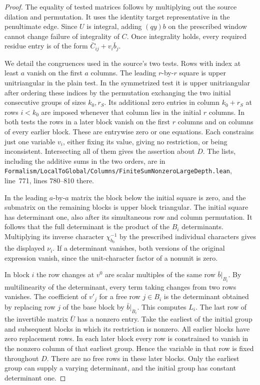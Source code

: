 \documentclass[a4paper,11pt]{article}
\theoremstyle{definition}
\theoremstyle{remark}
\newcommand{\srcloc}[2]{{\small\nolinkurl{#1.lean}}, line~#2}
\numberwithin{equation}{section}
\begin{document}
\begin{proof}
The equality of tested matrices follows by multiplying out
the source dilation and permutation. It uses the identity
target representative in the penultimate edge. Since \(U\)
is integral, adding \((qy)b\) on the prescribed window cannot
change failure of integrality of \(C\). Once integrality
holds, every required residue entry is of the form
\(\bar C_{ij}+v_i\bar b_j\).

We detail the congruences used in the source's two tests.
Rows with index at least \(a\) vanish on the first \(a\)
columns. The leading \(r\)-by-\(r\) square is upper
unitriangular in the plain test. In the symmetrized test
it is upper unitriangular after ordering these indices by
the permutation exchanging the two initial consecutive groups
of sizes \(k_0,r_S\). Its additional zero entries in column
\(k_0+r_S\) at rows \(i<k_0\) are imposed whenever that column lies in the
initial \(r\) columns. In both tests the rows in a later
block vanish on the first \(r\) columns and on columns of
every earlier block. These are entrywise zero or one equations.
Each constrains just one variable \(v_i\), either fixing its
value, giving no restriction, or being inconsistent. Intersecting
all of them gives the assertion about \(D\). The lists, including
the additive sums in the two orders, are in
\srcloc{Formalism/LocalToGlobal/Columns/FiniteSumNonzeroLargeDepth}{771},
lines 780--810 there.

In the leading \(a\)-by-\(a\) matrix the block below the
initial square is zero, and the submatrix on the remaining
blocks is upper block triangular. The initial square has determinant
one, also after its simultaneous row and column permutation.
It follows that the full determinant is the product of the
\(B_i\) determinants. Multiplying its inverse character
\(\chi_{b_0}^{-1}\) by the prescribed individual characters
gives the displayed \(\nu_i\). If a determinant vanishes,
both versions of the original expression vanish, since the
unit-character factor of a nonunit is zero.

In block \(i\) the row changes at \(v^0\) are scalar multiples
of the same row \(\bar b|_{B_i}\). By multilinearity of the
determinant, every term taking changes from two rows vanishes.
The coefficient of \(v'_j\) for a free row \(j\in B_i\) is
the determinant obtained by replacing row \(j\) of the base
block by \(\bar b|_{B_i}\). This computes \(L_i\).
The last row of the invertible matrix \(\bar U\) has a
nonzero entry. Take the earliest of the initial
group and subsequent blocks in which its restriction is
nonzero. All earlier blocks have zero replacement rows.
In each later block every row is constrained to vanish in
the nonzero column of that earliest group. Hence the
variable in that row is fixed throughout \(D\). There are
no free rows in these later blocks. Only the earliest group
can supply a varying determinant, and the initial group
has constant determinant one.


\end{proof}
\end{document}
